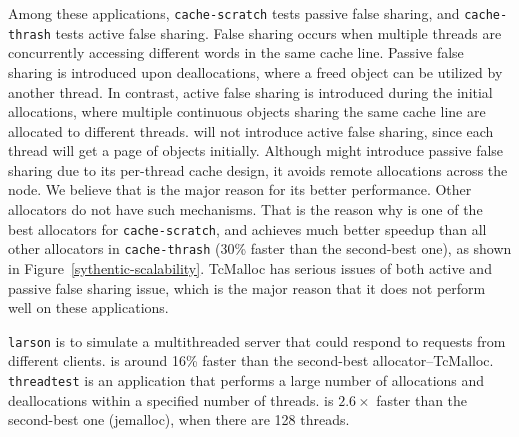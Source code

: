 Among these applications, \texttt{cache-scratch} tests passive false sharing, and \texttt{cache-thrash} tests active false sharing. False sharing occurs when multiple threads are concurrently accessing different words in the same cache line. 
Passive false sharing is introduced upon deallocations, where a freed object can be utilized by another thread. In contrast, active false sharing is introduced during the initial allocations, where multiple continuous objects sharing the same cache line are allocated to different threads. 
 \NM{} will not introduce active false sharing, since each thread will get a page of objects initially. Although \NM{} might introduce passive false sharing due to its per-thread cache design, it avoids remote allocations across the node. 
 We believe that is the major reason for its better performance. Other allocators do not have such mechanisms. 
 That is the reason why \NM{} is one of the best allocators for \texttt{cache-scratch}, and achieves much better speedup than all other allocators in \texttt{cache-thrash} (30\% faster than the second-best one), as shown in Figure~\ref{sythentic-scalability}. TcMalloc has serious issues of both active and passive false sharing issue, which is the major reason that it does not perform well on these applications.  
 
 \texttt{larson} is to simulate a multithreaded server that could respond to requests from different clients. \NM{} is around 16\% faster than the second-best allocator--TcMalloc.  
 \texttt{threadtest} is an application that performs a large number of allocations and deallocations within a specified number of threads. \NM{} is $2.6\times$ faster than the second-best one (jemalloc), when there are 128 threads.





